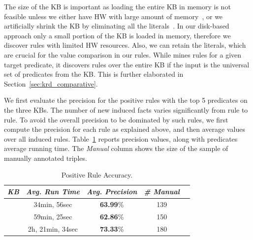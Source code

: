 The size of the KB is important as loading the entire KB in memory is not feasible unless we either have HW with large amount of memory~\cite{Chen:2016,DBLP:conf/sigmod/FaridRIHC16},  or we artificially shrink the KB by eliminating all the literals~\cite{galarraga2015fast}. In our disk-based approach only a small portion of the KB is loaded in memory, therefore we discover rules with limited HW resources. Also, we can retain the literals, which are crucial for the value comparison in our rules. While \krd mines rules for a given target predicate, it discovers rules over the entire KB if the input is the universal set of predicates from the KB. This is further elaborated in Section~\ref{sec:krd_comparative}.


We first evaluate the precision for the positive rules with the top 5 predicates on the three KBs. 
The number of new induced facts varies significantly from rule to rule.
To avoid the overall precision to be dominated by such rules, we first compute the precision for each rule as explained above, and then average values over all induced rules.
 Table~\ref{tab:pos_rules_acc} reports precision values, along with predicates average running time.
 The \emph{Manual} column shows the size of the sample of manually annotated triples.

\begin{table}[t]
\vspace{-2ex}
	\centering
	\caption{Positive Rule Accuracy.}
	\label{tab:pos_rules_acc}
	\begin{small}
	\begin{tabular}{|c|c|c|c|c|}
		\hline
		\hline
		{\it KB}&{\it Avg. Run Time}&{\it Avg. Precision}&{\it \# Manual} \tabularnewline
		\hline
		\dbpedia & 34min, 56sec & \textbf{63.99}\% & 139\tabularnewline
		\yago &  59min, 25sec & \textbf{62.86}\% & 150\tabularnewline
		\wikidata &  2h, 21min, 34sec & \textbf{73.33}\% & 180\tabularnewline
		\hline
	\end{tabular}
	\end{small}
\end{table}

